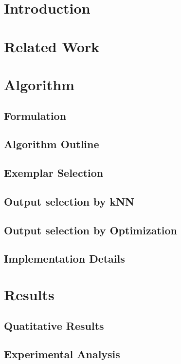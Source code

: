 \section{Introduction}


\section{Related Work}


\section{Algorithm}


\subsection{Formulation}


\subsection{Algorithm Outline}


\subsection{Exemplar Selection}


\subsection{Output selection by kNN}


\subsection{Output selection by Optimization}


\subsection{Implementation Details}


\section{Results}


\subsection{Quatitative Results}


\subsection{Experimental Analysis}

